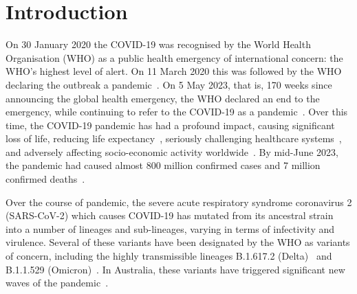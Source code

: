\documentclass{article}
\begin{document}
\section{Introduction}
\label{sec:main}
On 30 January 2020 the COVID-19 was recognised by the World Health Organisation (WHO) as a public health emergency of international concern: the WHO's highest level of alert. On 11 March 2020 this was followed by the WHO declaring the outbreak a pandemic~\cite{WHO11032020}. On 5 May 2023, that is, 170 weeks since announcing the global health emergency, the WHO declared an end to the emergency, while continuing to refer to the COVID-19 as a pandemic~\cite{WHO05052023}. Over this time, the COVID-19 pandemic has had a profound impact, causing significant loss of life, reducing life expectancy~\cite{andrasfay2021reductions,aburto2022quantifying}, seriously challenging healthcare systems~\cite{miller2020disease}, and adversely affecting socio-economic activity worldwide~\cite{del_rio-chanona_supply_2020}. By mid-June 2023, the pandemic had caused almost 800 million confirmed cases and 7 million confirmed deaths~\cite{owidcoronavirus}. 

Over the course of pandemic, the severe acute respiratory syndrome coronavirus 2 (SARS-CoV-2) which causes COVID-19 has mutated from its ancestral strain into a number of lineages and sub-lineages, varying in terms of infectivity and virulence. Several of these variants have been designated by the WHO as variants of concern, including the highly transmissible lineages B.1.617.2 (Delta)~\cite{campbell2021increased,milne2022mitigating} and B.1.1.529 (Omicron)~\cite{karim2021omicron,duong2022sars}. In Australia, these variants have triggered significant new waves of the pandemic~\cite{covid19data,chang_simulating_2022,porter2022new,chang_persistence_2023}. 
\end{document}
